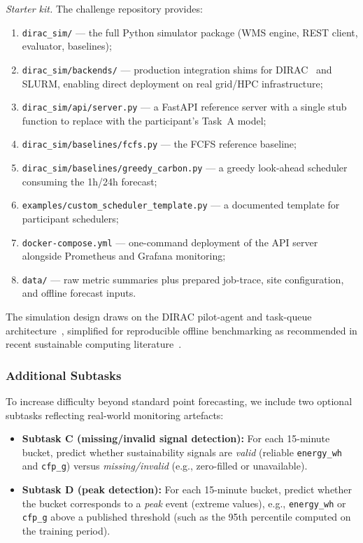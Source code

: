 \medskip
\noindent\textit{Starter kit.}
The challenge repository provides:
\begin{enumerate}
  \item \texttt{dirac\_sim/} — the full Python simulator package
        (WMS engine, REST client, evaluator, baselines);
  \item \texttt{dirac\_sim/backends/} — production integration shims for
        DIRAC~\cite{Tsaregorodtsev2010} and SLURM, enabling
        direct deployment on real grid/HPC infrastructure;
  \item \texttt{dirac\_sim/api/server.py} — a FastAPI reference server
        with a single stub function to replace with the participant's
        Task~A model;
  \item \texttt{dirac\_sim/baselines/fcfs.py} — the FCFS reference baseline;
  \item \texttt{dirac\_sim/baselines/greedy\_carbon.py} — a greedy
        look-ahead scheduler consuming the 1h/24h forecast;
  \item \texttt{examples/custom\_scheduler\_template.py} — a documented
        template for participant schedulers;
  \item \texttt{docker-compose.yml} — one-command deployment of the API
        server alongside Prometheus and Grafana monitoring;
  \item \texttt{data/} — raw metric summaries plus prepared job-trace,
        site configuration, and offline forecast inputs.
\end{enumerate}
The simulation design draws on the DIRAC pilot-agent and task-queue
architecture~\cite{Tsaregorodtsev2010}, simplified for reproducible
offline benchmarking as recommended in recent sustainable computing
literature~\cite{Wiesner2024,SustainCluster2024}.

\subsubsection*{Additional Subtasks}

To increase difficulty beyond standard point forecasting, we include two
optional subtasks reflecting real-world monitoring artefacts:

\begin{itemize}
  \item \textbf{Subtask C (missing/invalid signal detection):}
        For each 15-minute bucket, predict whether sustainability signals are
        \textit{valid} (reliable \texttt{energy\_wh} and \texttt{cfp\_g})
        versus \textit{missing/invalid} (e.g., zero-filled or unavailable).

  \item \textbf{Subtask D (peak detection):}
        For each 15-minute bucket, predict whether the bucket corresponds to a
        \textit{peak} event (extreme values), e.g., \texttt{energy\_wh} or
        \texttt{cfp\_g} above a published threshold (such as the 95th
        percentile computed on the training period).
\end{itemize}

